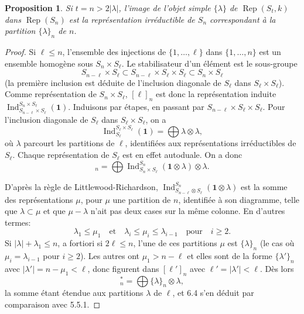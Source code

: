 \documentclass[11pt,a4paper]{article}
\theoremstyle{plain}
\newtheorem{proposition}[theorem]{Proposition}
\theoremstyle{definition}
\DeclareMathOperator{\Ind}{Ind}
\DeclareMathOperator{\Rep}{Rep}
\begin{document}
\begin{proposition}
Si $t = n > 2|\lambda|$, l'image de l'objet simple $\{\lambda\}$ de $\Rep(S_t, k)$ dans $\Rep(S_n)$ est la repr\'esentation irr\'eductible de $S_n$ correspondant \`a la partition $\{\lambda\}_n$ de $n$.
\end{proposition}

\begin{proof}
Si $\ell \leq n$, l'ensemble des injections de $\{1, \ldots, \ell\}$ dans $\{1, \ldots, n\}$ est un ensemble homog\`ene sous $S_n \times S_\ell$. Le stabilisateur d'un \'el\'ement est le sous-groupe
\[
S_{n-\ell} \times S_\ell \subset S_{n-\ell} \times S_\ell \times S_\ell \subset S_n \times S_\ell
\]
(la premi\`ere inclusion est d\'eduite de l'inclusion diagonale de $S_\ell$ dans $S_\ell \times S_\ell$). Comme repr\'esentation de $S_n \times S_\ell$, $[\ell]_n$ est donc la repr\'esentation induite $\Ind_{S_{n-\ell} \times S_\ell}^{S_n \times S_\ell}(\mathbf{1})$. Induisons par \'etapes, en passant par $S_{n-\ell} \times S_\ell \times S_\ell$. Pour l'inclusion diagonale de $S_\ell$ dans $S_\ell \times S_\ell$, on a
\[
\Ind_{S_\ell}^{S_\ell \times S_\ell}(\mathbf{1}) = \bigoplus \lambda \otimes \lambda,
\]
o\`u $\lambda$ parcourt les partitions de $\ell$, identifi\'ees aux repr\'esentations irr\'eductibles de $S_\ell$. Chaque repr\'esentation de $S_\ell$ est en effet autoduale. On a donc
\begin{equation}
[\ell]_n = \bigoplus \Ind_{S_n \times S_\ell}^{S_n}(\mathbf{1} \otimes \lambda) \otimes \lambda. \tag{6.4.1}
\end{equation}

D'apr\`es la r\`egle de Littlewood-Richardson, $\Ind_{S_{n-\ell} \otimes S_\ell}^{S_n}(\mathbf{1} \otimes \lambda)$ est la somme des repr\'esentations $\mu$, pour $\mu$ une partition de $n$, identifi\'ee \`a son diagramme, telle que $\lambda \subset \mu$ et que $\mu - \lambda$ n'ait pas deux cases sur la m\^eme colonne. En d'autres termes:
\[
\lambda_1 \leq \mu_1 \quad \text{et} \quad \lambda_i \leq \mu_i \leq \lambda_{i-1} \quad \text{pour} \quad i \geq 2.
\]
Si $|\lambda| + \lambda_1 \leq n$, a fortiori si $2\ell \leq n$, l'une de ces partitions $\mu$ est $\{\lambda\}_n$ (le cas o\`u $\mu_i = \lambda_{i-1}$ pour $i \geq 2$). Les autres ont $\mu_1 > n - \ell$ et elles sont de la forme $\{\lambda'\}_n$ avec $|\lambda'| = n - \mu_1 < \ell$, donc figurent dans $[\ell']_n$ avec $\ell' = |\lambda'| < \ell$. D\`es lors
\begin{equation}
[\ell]^*_n = \bigoplus \{\lambda\}_n \otimes \lambda, \tag{6.4.2}
\end{equation}
la somme \'etant \'etendue aux partitions $\lambda$ de $\ell$, et 6.4 s'en d\'eduit par comparaison avec 5.5.1.
\end{proof}
\end{document}
